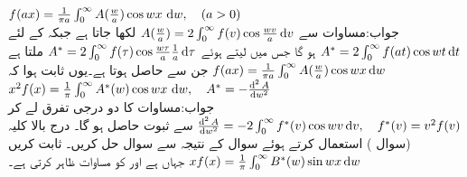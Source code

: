 \quad
$f(ax)=\tfrac{1}{\pi a}\int_0^{\infty} A(\tfrac{w}{a})\cos wx\,\dif w,\quad (a>0)$\\
جواب:\quad مساوات  سے 
$A(\tfrac{w}{a})=2\int_0^{\infty}f(v)\cos \tfrac{wv}{a}\dif v$
 لکھا جاتا ہے جبکہ  کے لئے 
$A^*=2\int_0^{\infty}f(at)\cos wt\dif t$
ہو گا جس میں  لیتے ہوئے 
$A^*=2\int_0^{\infty} f(\tau)\cos \tfrac{w\tau}{a}\tfrac{1}{a}\dif \tau$
ملتا ہے جن سے  حاصل ہوتا ہے۔یوں ثابت ہوا کہ
$f(ax)=\tfrac{1}{\pi a}\int_0^{\infty} A(\tfrac{w}{a})\cos wx\dif w$
\quad
$x^2f(x)=\tfrac{1}{\pi}\int_0^{\infty} A^*(w)\cos wx\,\dif w,\quad A^*=-\tfrac{\dif ^{\,2} A}{\dif w^2}$\\
جواب:\quad مساوات  کا دو درجی تفرق لے کر
$\tfrac{\dif^{\,2}A}{\dif w^2}=-2\int_0^{\infty} f^*(v)\cos wv\dif v, \quad f^*(v)=v^2f(v)$
سے ثبوت حاصل ہو گا۔
\quad درج بالا کلیہ (سوال ) استعمال کرتے ہوئے سوال  کے نتیجہ سے سوال  حل کریں۔ 
\quad ثابت کریں
$xf(x)=\tfrac{1}{\pi}\int_0^{\infty}B^*(w)\sin wx\dif w$
جہاں  ہے اور  کو مساوات  ظاہر کرتی ہے۔ 

